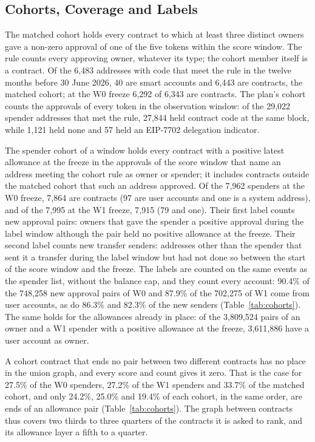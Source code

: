 \documentclass{ieeeaccess}
\begin{document}


\subsection{Cohorts, Coverage and Labels}
\label{sec:cohorts}
The matched cohort holds every contract to which at least three distinct owners gave a non-zero approval of one of the five tokens within the score window. The rule counts every approving owner, whatever its type; the cohort member itself is a contract. Of the 6,483 addresses with code that meet the rule in the twelve months before 30 June 2026, 40 are smart accounts and 6,443 are contracts, the matched cohort; at the W0 freeze 6,292 of 6,343 are contracts. The plan's cohort counts the approvals of every token in the observation window: of the 29,022 spender addresses that met the rule, 27,844 held contract code at the same block, while 1,121 held none and 57 held an EIP-7702 delegation indicator.

The spender cohort of a window holds every contract with a positive latest allowance at the freeze in the approvals of the score window that name an address meeting the cohort rule as owner or spender; it includes contracts outside the matched cohort that such an address approved. Of the 7,962 spenders at the W0 freeze, 7,864 are contracts (97 are user accounts and one is a system address), and of the 7,995 at the W1 freeze, 7,915 (79 and one). Their first label counts new approval pairs: owners that gave the spender a positive approval during the label window although the pair held no positive allowance at the freeze. Their second label counts new transfer senders: addresses other than the spender that sent it a transfer during the label window but had not done so between the start of the score window and the freeze. The labels are counted on the same events as the spender list, without the balance cap, and they count every account: 90.4\% of the 748,258 new approval pairs of W0 and 87.9\% of the 702,275 of W1 come from user accounts, as do 86.3\% and 82.3\% of the new senders (Table~\ref{tab:cohorts}). The same holds for the allowances already in place: of the 3,809,524 pairs of an owner and a W1 spender with a positive allowance at the freeze, 3,611,886 have a user account as owner.

A cohort contract that ends no pair between two different contracts has no place in the union graph, and every score and count gives it zero. That is the case for 27.5\% of the W0 spenders, 27.2\% of the W1 spenders and 33.7\% of the matched cohort, and only 24.2\%, 25.0\% and 19.4\% of each cohort, in the same order, are ends of an allowance pair (Table~\ref{tab:cohorts}). The graph between contracts thus covers two thirds to three quarters of the contracts it is asked to rank, and its allowance layer a fifth to a quarter.
\end{document}
